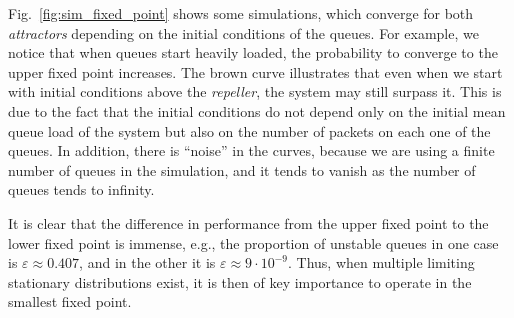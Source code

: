 Fig.~\ref{fig:sim_fixed_point} shows some simulations, which converge for both \textit{attractors} depending on the initial conditions of the queues. For example, we notice that when queues start heavily loaded, the probability to converge to the upper fixed point increases.
%
The brown curve illustrates that even when we start with initial conditions above the \textit{repeller}, the system may still surpass it.
%
This is due to the fact that the initial conditions do not depend only on the initial mean queue load of the system but also on the number of packets on each one of the queues.
%
In addition, there is ``noise'' in the curves, because we are using a finite number of queues in the simulation, and it tends to vanish as the number of queues tends to infinity.

It is clear that the difference in performance from the upper fixed point to the lower fixed point is immense, e.g., the proportion of unstable queues in one case is $\varepsilon \approx 0.407$, and in the other it is $\varepsilon \approx 9\cdot 10^{-9}$.
%
Thus, when multiple limiting stationary distributions exist, it is then of key importance to operate in the smallest fixed point.

